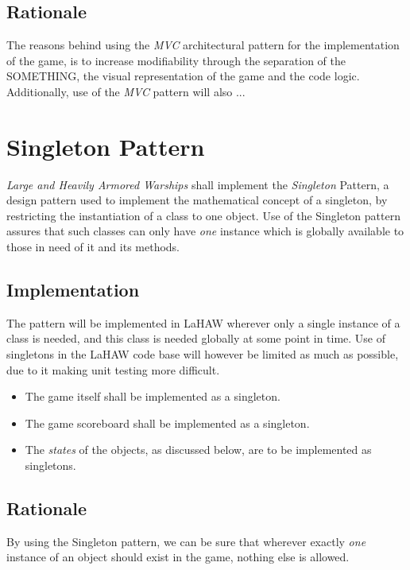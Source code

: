     
    \subsection{Rationale}
    The reasons behind using the \emph{MVC} architectural pattern for the implementation of the game, is to increase modifiability through the separation of the SOMETHING, the visual representation of the game and the code logic. Additionally, use of the \emph{MVC} pattern will also ...


    \section{Singleton Pattern}
    \emph{Large and Heavily Armored Warships} shall implement the \emph{Singleton} Pattern, a design pattern used to implement the mathematical concept of a singleton, by restricting the instantiation of a class to one object\cite{singleton}.
    Use of the Singleton pattern assures that such classes can only have \emph{one} instance which is globally available to those in need of it and its methods.
    
    \subsection{Implementation}
    The pattern will be implemented in LaHAW wherever only a single instance of a class is needed, and this class is needed globally at some point in time. Use of singletons in the LaHAW code base will however be limited as much as possible, due to it making unit testing more difficult\cite{singleton_unit_testing}.
    
    \begin{itemize}
        \item The game itself shall be implemented as a singleton.
        \item The game scoreboard shall be implemented as a singleton.
        \item The \emph{states} of the objects, as discussed below, are to be implemented as singletons.
    
    \end{itemize}
    
    \subsection{Rationale}
    By using the Singleton pattern, we can be sure that wherever exactly \emph{one} instance of an object should exist in the game, nothing else is allowed.
    

